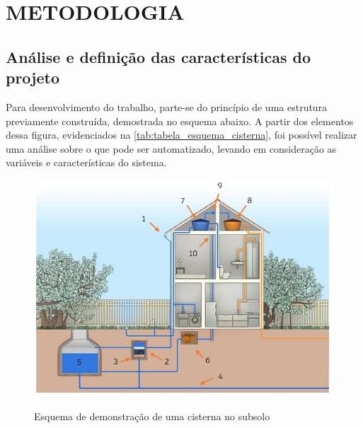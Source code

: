 
\chapter{METODOLOGIA}
\label{chap:metodologia}


\section{Análise e definição das características do projeto}

Para desenvolvimento do trabalho, parte-se do princípio de uma estrutura previamente construída, demostrada no esquema abaixo. A partir dos elementos dessa figura, evidenciados na \autoref{tab:tabela_esquema_cisterna}, foi possível realizar uma análise sobre o que pode ser automatizado, levando em consideração as variáveis e características do sistema.  

\begin{figure}[H]
	\centering
	\caption{Esquema de demonstração de uma cisterna no subsolo}
	\includegraphics[width=1.0\textwidth]{figuras/esquema_cisterna.png}
	\label{fig:esquema_cisterna}
\end{figure}

\newpage

